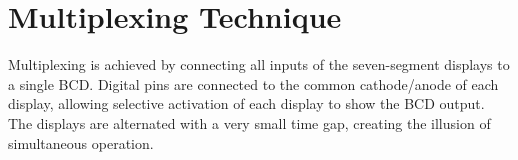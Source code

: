 \section{Multiplexing Technique}
Multiplexing is achieved by connecting all inputs of the seven-segment displays to a single BCD. Digital pins are connected to the common cathode/anode of each display, allowing selective activation of each display to show the BCD output. The displays are alternated with a very small time gap, creating the illusion of simultaneous operation.
